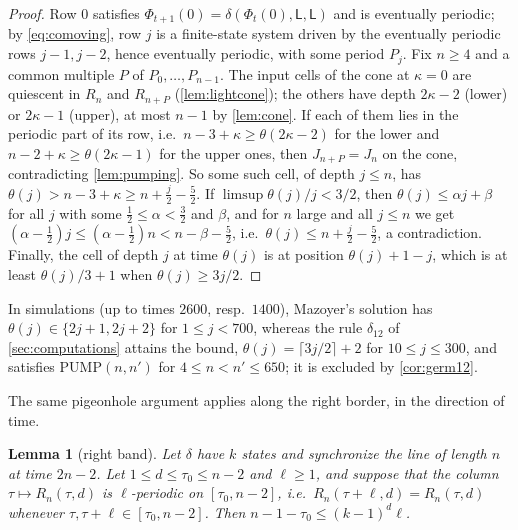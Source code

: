 \documentclass[3p]{elsarticle}
\newtheorem{lemma}[theorem]{Lemma}
\theoremstyle{definition}
\newcommand{\Lq}{\mathsf L}
\begin{document}
\begin{proof}
Row $0$ satisfies $\Phi_{t+1}(0)=\delta(\Phi_t(0),\Lq,\Lq)$ and is eventually
periodic; by \eqref{eq:comoving}, row $j$ is a finite-state system driven by
the eventually periodic rows $j-1,j-2$, hence eventually periodic, with some
period $P_j$. Fix $n\ge4$ and a common
multiple $P$ of $P_0,\dots,P_{n-1}$. The input cells of the cone at $\kappa=0$
are quiescent in $R_n$ and $R_{n+P}$ (\cref{lem:lightcone}); the others have
depth $2\kappa-2$ (lower) or $2\kappa-1$ (upper), at most $n-1$ by
\cref{lem:cone}. If each of them lies in the periodic part of its row, i.e.\
$n-3+\kappa\ge\theta(2\kappa-2)$ for the lower and
$n-2+\kappa\ge\theta(2\kappa-1)$ for the upper ones, then $J_{n+P}=J_n$ on
the cone, contradicting \cref{lem:pumping}. So some such cell, of depth $j\le
n$, has $\theta(j)>n-3+\kappa\ge n+\frac{j}{2}-\frac52$. If
$\limsup\theta(j)/j<3/2$, then $\theta(j)\le\alpha j+\beta$ for all $j$ with
some $\tfrac12\le\alpha<\tfrac32$ and $\beta$, and for $n$ large and all $j\le
n$ we get $(\alpha-\tfrac12)j\le(\alpha-\tfrac12)n<n-\beta-\tfrac52$, i.e.\
$\theta(j)\le n+\tfrac j2-\tfrac52$, a contradiction. Finally, the cell of
depth $j$ at time $\theta(j)$ is at position $\theta(j)+1-j$, which is at
least $\theta(j)/3+1$ when $\theta(j)\ge 3j/2$.
\end{proof}

In simulations (up to times $2600$, resp.\ $1400$), Mazoyer's solution has
$\theta(j)\in\{2j+1,2j+2\}$ for $1\le j<700$, whereas the rule $\delta_{12}$ of
\cref{sec:computations} attains the bound, $\theta(j)=\lceil 3j/2\rceil+2$ for
$10\le j\le300$, and satisfies $\mathrm{PUMP}(n,n')$ for $4\le n<n'\le650$; it
is excluded by \cref{cor:germ12}.

The same pigeonhole argument applies along the right border, in the direction
of time.

\begin{lemma}[right band]\label{lem:rightband}
Let $\delta$ have $k$ states and synchronize the line of length $n$ at time
$2n-2$. Let $1\le d\le\tau_0\le n-2$ and $\ell\ge1$, and suppose that the
column $\tau\mapsto R_n(\tau,d)$ is $\ell$-periodic on $[\tau_0,n-2]$, i.e.\
$R_n(\tau+\ell,d)=R_n(\tau,d)$ whenever $\tau,\tau+\ell\in[\tau_0,n-2]$. Then
$n-1-\tau_0\le(k-1)^d\ell$.
\end{lemma}
\end{document}
